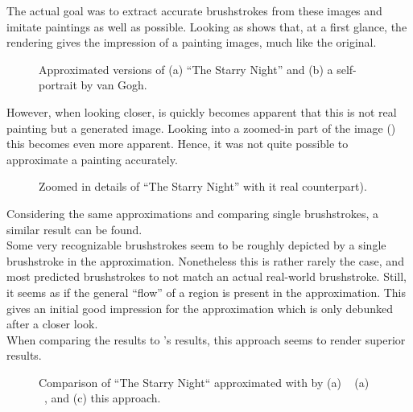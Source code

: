 The actual goal was to extract accurate brushstrokes from these images and imitate paintings as well as possible.
Looking as  shows that, at a first glance, the rendering gives the impression of a painting images, much like the original.\\
\begin{figure}[!htp]
    \caption{Approximated versions of (a) ``The Starry Night'' and (b) a self-portrait by van Gogh.}
\end{figure}
However, when looking closer, is quickly becomes apparent that this is not real painting but a generated image.
Looking into a zoomed-in part of the image () this becomes even more apparent.
Hence, it was not quite possible to approximate a painting accurately.
\begin{figure}[!htp]
    \caption{Zoomed in details of ``The Starry Night'' with it real counterpart).}
\end{figure}

Considering the same approximations and comparing single brushstrokes, a similar result can be found.\\
Some very recognizable brushstrokes seem to be roughly depicted by a single brushstroke in the approximation.
Nonetheless this is rather rarely the case, and most predicted brushstrokes to not match an actual real-world brushstroke.
Still, it seems as if the general ``flow'' of a region is present in the approximation.
This gives an initial good impression for the approximation which is only debunked after a closer look.\\
When comparing the results to \citeauthor*{LpaintB}'s results, this approach seems to render superior results.
\begin{figure}[!htp]
    \caption{Comparison of ``The Starry Night`` approximated with by (a) \citeauthor*{LpaintB}~\cite{LpaintB} (a) \citeauthor*{paintbot}~\cite{paintbot}, and (c) this approach.}
\end{figure}


